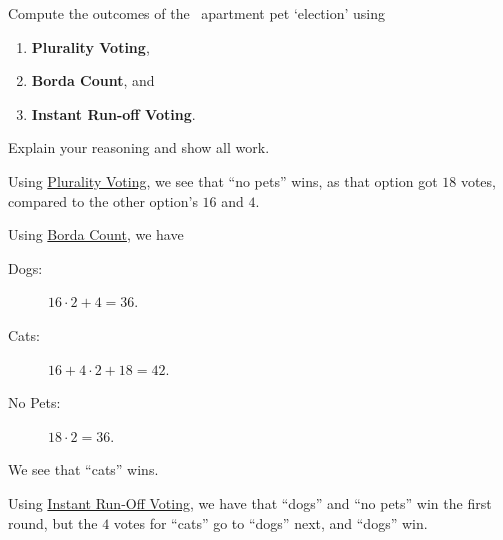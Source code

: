 \documentclass[nooutcomes,noauthor,hints,handout]{ximera}
\begin{document}
\mynewpage




\begin{question}
  Compute the outcomes of the \mooculus~apartment pet `election'
  using
  \begin{enumerate}
  \item \textbf{Plurality Voting},
  \item \textbf{Borda Count}, and
  \item \textbf{Instant Run-off Voting}.
  \end{enumerate}
  Explain your reasoning and show all work.
  \begin{freeResponse}
    Using \underline{Plurality Voting}, we see that ``no pets'' wins, as that
    option got $18$ votes, compared to the other option's $16$ and
    $4$.


    
    Using \underline{Borda Count}, we have
    \begin{description}
      \item[Dogs:] $16\cdot 2 + 4 = 36$.
      \item[Cats:] $16 +4\cdot 2+18 =42$.
      \item[No Pets:] $18\cdot 2 = 36$.
    \end{description}
  
  We see that ``cats'' wins.

  

  Using \underline{Instant Run-Off Voting}, we have that ``dogs'' and
  ``no pets'' win the first round, but the $4$ votes for ``cats'' go
  to ``dogs'' next, and ``dogs'' win.
  \end{freeResponse}
\end{question}
\mynewpage
\end{document}
